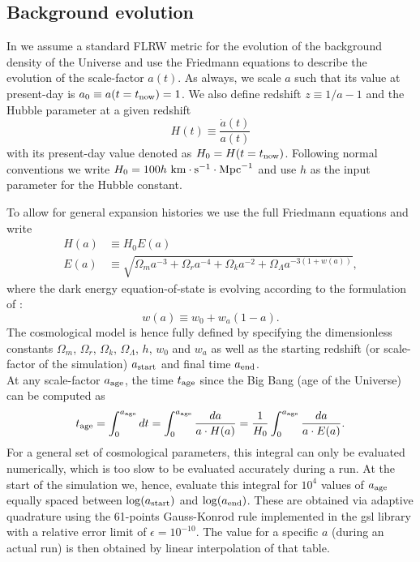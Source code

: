 \subsection{Background evolution}
\label{ssec:flrw}

In \swift we assume a standard FLRW metric for the evolution of the
background density of the Universe and use the Friedmann equations to
describe the evolution of the scale-factor $a(t)$.  As always, we
scale $a$ such that its value at present-day is
$a_0 \equiv a(t=t_{\rm now}) = 1$. We also define redshift
$z \equiv 1/a - 1$ and the Hubble parameter at a given redshift
\begin{equation}
H(t) \equiv \frac{\dot{a}(t)}{a(t)}
\end{equation}
with its present-day value denoted as $H_0 = H(t=t_{\rm
  now})$. Following normal conventions we write
$H_0 = 100 h~\rm{km}\cdot\rm{s}^{-1}\cdot\rm{Mpc}^{-1}$ and use $h$ as
the input parameter for the Hubble constant.

To allow for general expansion histories we use the full Friedmann
equations and write
\begin{align}
H(a) &\equiv H_0 E(a) \\
     E(a) &\equiv\sqrt{\Omega_m a^{-3} + \Omega_r a^{-4} + \Omega_k a^{-2} + \Omega_\Lambda a^{-3(1+w(a))}},
\label{eq:friedmann}
\end{align}
where the dark energy equation-of-state is evolving according to the
formulation of \cite{Linder2003}:
\begin{equation}
w(a) \equiv w_0 + w_a(1-a).
\end{equation}
The cosmological model is hence fully defined by specifying the
dimensionless constants $\Omega_m$, $\Omega_r$, $\Omega_k$,
$\Omega_\Lambda$, $h$, $w_0$ and $w_a$ as well as the starting
redshift (or scale-factor of the simulation) $a_{\rm start}$ and final
time $a_{\rm end}$. \\ At any scale-factor $a_{\rm age}$, the time
$t_{\rm age}$ since the Big Bang (age of the Universe) can be computed
as
\begin{equation}
  t_{\rm age} = \int_{0}^{a_{\rm age}} dt = \int_{0}^{a_{\rm age}} \frac{da}{a \cdot H(a)} = \frac{1}{H_0} \int_{0}^{a_{\rm age}} \frac{da}{a \cdot E(a)}.
\end{equation}
For a general set of cosmological parameters, this integral can only
be evaluated numerically, which is too slow to be evaluated accurately
during a run. At the start of the simulation we, hence, evaluate this
integral for $10^4$ values of $a_{\rm age}$ equally spaced between
$\log(a_{\rm start})$ and $\log(a_{\rm end})$. These are obtained via
adaptive quadrature using the 61-points Gauss-Konrod rule implemented
in the {\sc gsl} library \citep{GSL} with a relative error limit of
$\epsilon=10^{-10}$. The value for a specific $a$ (during an actual
run) is then obtained by linear interpolation of that table.

